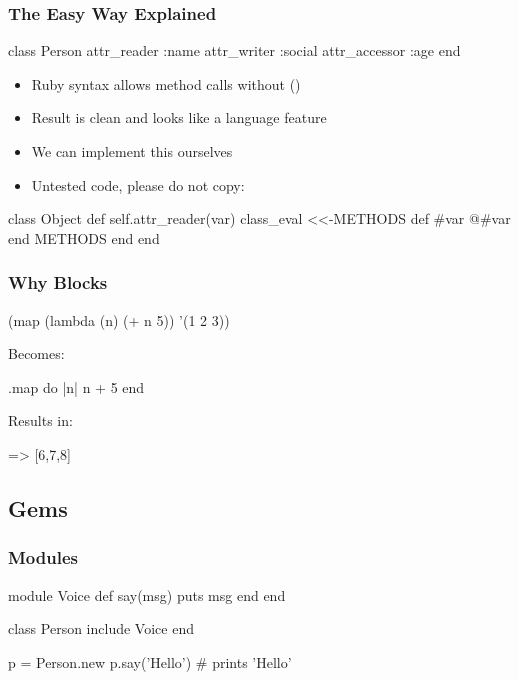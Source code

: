 \begin{frame}[fragile]
  \frametitle{The Easy Way Explained}
  \begin{rubycode}
    class Person
      attr_reader :name
      attr_writer :social
      attr_accessor :age
    end
  \end{rubycode}
  \begin{itemize}
  \item Ruby syntax allows method calls without ()
  \pause
  \item Result is clean and looks like a language feature
  \end{itemize}
\end{frame}

\begin{frame}[fragile]
  \begin{itemize}
  \item We can implement this ourselves
  \pause
  \item Untested code, please do not copy:
  \end{itemize}
  \begin{rubycode}
    class Object
      def self.attr_reader(var)
        class_eval <<-METHODS
          def #{var}
            @#{var}
          end
    METHODS
      end
    end
  \end{rubycode}
\end{frame}

\begin{frame}[fragile]
  \frametitle{Why Blocks}
  \begin{schemecode}
    (map (lambda (n)
           (+ n 5))
         '(1 2 3))
  \end{schemecode}
  Becomes:
  \begin{rubycode}
    [1,2,3].map do |n|
      n + 5
    end
  \end{rubycode}
  Results in:
  \begin{console}
    => [6,7,8]
  \end{console}
\end{frame}

\subsection{Gems}

\begin{frame}[fragile]
  \frametitle{Modules}
  \begin{rubycode}
    module Voice
      def say(msg)
        puts msg
      end
    end

    class Person
      include Voice
    end

    p = Person.new
    p.say('Hello') # prints 'Hello'
  \end{rubycode}
\end{frame}

